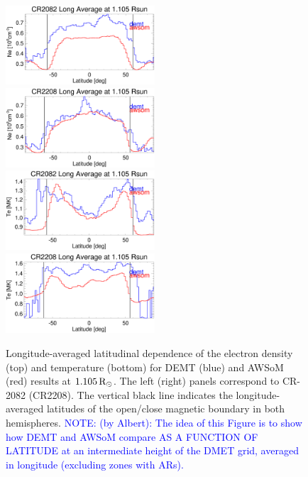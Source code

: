 \documentclass[namedreferences]{solarphysics}
\newcommand{\mrsun}{{\rm R_\odot}}
\def\notebyalbert#1{\textcolor{blue}{NOTE: #1}}
\begin{document}
\begin{article}
\begin{figure}[h!]
\begin{center}
\includegraphics[width=0.495\textwidth]{figs/Perfil_Ne_demt_awsom_2082_1105.eps}
\includegraphics[width=0.495\textwidth]{figs/Perfil_Ne_demt_awsom_2208_1105.eps}
\includegraphics[width=0.495\textwidth]{figs/Perfil_Te_demt_awsom_2082_1105.eps}
\includegraphics[width=0.495\textwidth]{figs/Perfil_Te_demt_awsom_2208_1105.eps}
\caption{Longitude-averaged latitudinal dependence of the electron density (top) and temperature (bottom) for DEMT (blue) and AWSoM (red) results at $1.105\,\mrsun$. The left (right) panels correspond to CR-2082 (CR2208). The vertical black line indicates the longitude-averaged latitudes of the open/close magnetic boundary in both hemispheres. \notebyalbert{(by Albert): The idea of this Figure is to show how DEMT and AWSoM compare AS A FUNCTION OF LATITUDE at an intermediate height of the DMET grid, averaged in longitude (excluding zones with ARs).}}
\label{perf_lat}
\end{center}
\end{figure}


\end{article}
\end{document}
